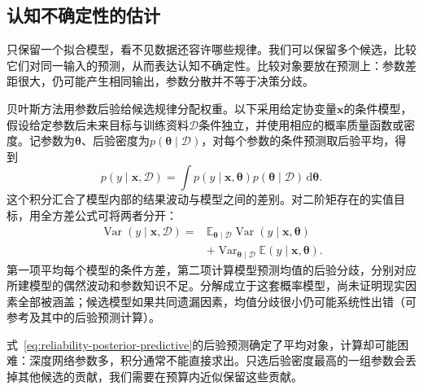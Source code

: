 \subsection{认知不确定性的估计}
\label{sec:reliability-epistemic-estimation}

只保留一个拟合模型，看不见数据还容许哪些规律。我们可以保留多个候选，比较它们对同一输入的预测，从而表达认知不确定性。比较对象要放在预测上：参数差距很大，仍可能产生相同输出，参数分散并不等于决策分歧。

贝叶斯方法用参数后验给候选规律分配权重。以下采用给定协变量$\bm x$的条件模型，假设给定参数后未来目标与训练资料$\mathcal D$条件独立，并使用相应的概率质量函数或密度。记参数为$\bm{\theta}$、后验密度为$p(\bm{\theta}\mid\mathcal D)$，对每个参数的条件预测取后验平均，得到
\begin{equation}
 p(y\mid\bm{x},\mathcal D)
 =\int p(y\mid\bm{x},\bm{\theta})
       p(\bm{\theta}\mid\mathcal D)\,\mathrm d\bm{\theta}.
 \label{eq:reliability-posterior-predictive}
\end{equation}
这个积分汇合了模型内部的结果波动与模型之间的差别。对二阶矩存在的实值目标，用全方差公式可将两者分开：
\begin{equation}
 \begin{aligned}
 \operatorname{Var}(y\mid\bm{x},\mathcal D)
 ={}&\mathbb E_{\bm{\theta}\mid\mathcal D}
       \operatorname{Var}(y\mid\bm{x},\bm{\theta})\\
 &+\operatorname{Var}_{\bm{\theta}\mid\mathcal D}
       \mathbb E(y\mid\bm{x},\bm{\theta}).
 \end{aligned}
 \label{eq:reliability-variance-decomposition}
\end{equation}
第一项平均每个模型的条件方差，第二项计算模型预测均值的后验分歧，分别对应所建模型的偶然波动和参数知识不足。分解成立于这套概率模型，尚未证明现实因素全部被涵盖；候选模型如果共同遗漏因素，均值分歧很小仍可能系统性出错（可参考及其中的后验预测计算）。

式~\eqref{eq:reliability-posterior-predictive}的后验预测确定了平均对象，计算却可能困难：深度网络参数多，积分通常不能直接求出。只选后验密度最高的一组参数会丢掉其他候选的贡献，我们需要在预算内近似保留这些贡献。

